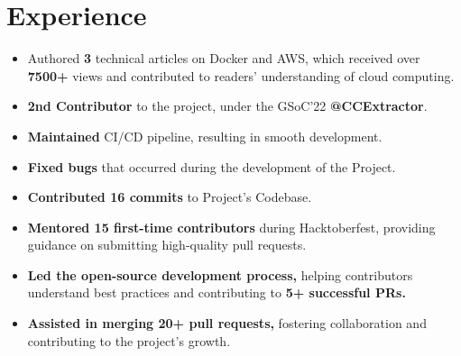 \documentclass[]{deedy-resume-openfont}
\begin{document}
\hfill
\begin{minipage}[t]{0.66\textwidth} 


\section{Experience}
\vspace{\topsep}
\begin{itemize}[leftmargin=*]
    \item Authored \textbf{3} technical articles on Docker and AWS, which received over \textbf{7500+} views and contributed to readers’ understanding of cloud computing.
\end{itemize}

\sectionsep

\vspace{\topsep}
\begin{itemize}[leftmargin=*]
    \item \textbf{2nd Contributor} to the project, under the GSoC'22 \textbf{@CCExtractor}.
    \vspace{-1.9mm} %
    \item \textbf{Maintained} CI/CD pipeline, resulting in smooth development.
    \vspace{-1.9mm}
    \item \textbf{Fixed bugs} that occurred during the development of the Project.
    \vspace{-1.9mm}
    \item \textbf{Contributed 16 commits} to Project's Codebase.
\end{itemize}

\sectionsep

\begin{itemize}[leftmargin=*]
    \item \textbf{Mentored 15 first-time contributors} during Hacktoberfest, providing guidance on submitting high-quality pull requests.
    \vspace{-2.3mm} %
    \item \textbf{Led the open-source development process,} helping contributors understand best practices and contributing to \textbf{5+ successful PRs.}
    \vspace{-2.3mm}
    \item \textbf{Assisted in merging 20+ pull requests,} fostering collaboration and contributing to the project's growth.
\end{itemize}
\sectionsep


\end{minipage}
\end{document}
